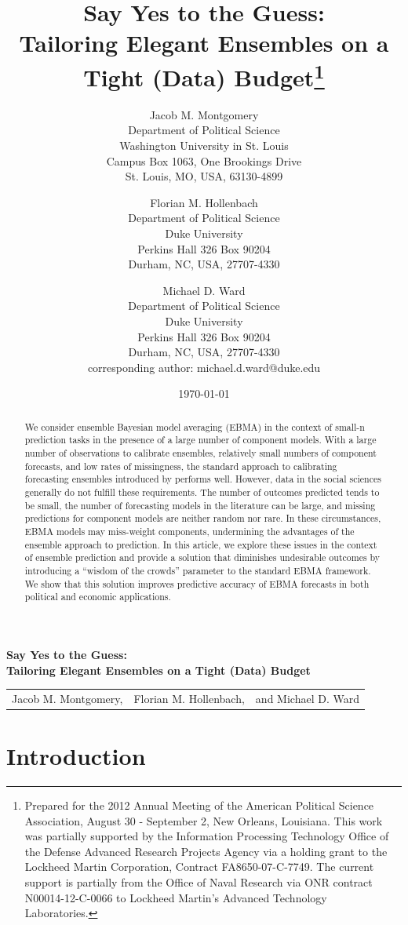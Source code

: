 \documentclass[12pt,fullpage,endnotes]{article}
\title{Say Yes to the Guess: \\ Tailoring Elegant Ensembles on a Tight
  (Data) Budget\thanks{Prepared for the 2012 Annual Meeting of the American Political Science Association, August 30 - September 2, New Orleans, Louisiana. 
This work was partially supported by the Information Processing Technology Office of the Defense Advanced Research Projects Agency via a holding grant to the Lockheed Martin Corporation, Contract FA8650-07-C-7749. The current support is partially from the Office of Naval Research via ONR contract N00014-12-C-0066 to Lockheed Martin's Advanced Technology Laboratories.
    }}
\author{
Jacob M. Montgomery\\
	Department of Political Science\\
	Washington University in St. Louis\\
	Campus Box 1063, One Brookings Drive\\
	St. Louis, MO, USA, 63130-4899 
	\and
Florian M. Hollenbach  \\
	Department of Political Science\\
	Duke University\\
	Perkins Hall 326 Box 90204\\
	Durham, NC, USA, 27707-4330
	\and
Michael D. Ward\\
	Department of Political Science\\
	Duke University\\
	Perkins Hall 326 Box 90204\\
	Durham, NC, USA, 27707-4330\\
	corresponding author: michael.d.ward@duke.edu
}
\date{\today}
\begin{document}
\maketitle
\thispagestyle{empty}
\clearpage
\pagestyle{myheadings}
\newpage
\singlespacing

\thispagestyle{empty}

{\centering \bf \large Say Yes to the Guess: \\ Tailoring Elegant Ensembles on a Tight (Data) Budget \\}


\begin{center}
\begin{tabular}{c@{ }c@{ }c}

Jacob M. Montgomery, & Florian M. Hollenbach, & and Michael D. Ward\\
\end{tabular}
\end{center}

\begin{abstract}
  \noindent We consider ensemble Bayesian model averaging (EBMA) in
  the context of small-n prediction tasks in the presence of a large
  number of component models.  With a large number of observations to
  calibrate ensembles, relatively small numbers of component
  forecasts, and low rates of missingness, the standard approach to
  calibrating forecasting ensembles introduced by \cite{Raftery:2005}
  performs well. However, data in the social sciences generally do not
  fulfill these requirements. The number of outcomes predicted tends
  to be small, the number of forecasting models in the literature can
  be large, and missing predictions for component models are neither
  random nor rare. In these circumstances, EBMA models may miss-weight
  components, undermining the advantages of the ensemble approach to
  prediction.  In this article, we explore these issues in the context
  of ensemble prediction and provide a solution that diminishes
  undesirable outcomes by introducing a ``wisdom of the crowds''
  parameter to the standard EBMA framework. We show that this solution
  improves predictive accuracy of EBMA forecasts in both political and
  economic applications.
\end{abstract}

\doublespacing


\setcounter{page}{1}

\section{Introduction}
\end{document}
